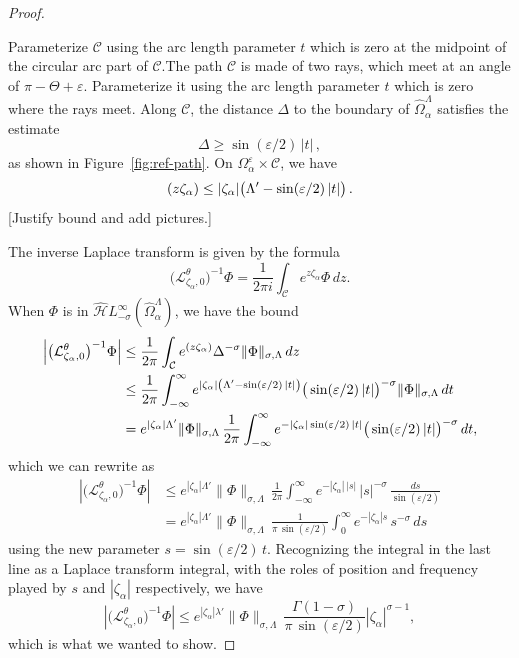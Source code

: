 \documentclass{article}
\let\Re\relax
\DeclareMathOperator{\Re}{Re}
\newcommand{\dualsingexp}[1]{\widehat{\mathcal{H}}L^\infty_{#1}}
\newcommand{\laplace}{\mathcal{L}}
\theoremstyle{definition}
\theoremstyle{plain}
\newenvironment{todo}{\color{Coral}}{\color{black}}
\begin{document}
\begin{proof}
\begin{center}
\label{fig:ref-path}
\end{center}
Parameterize $\mathcal{C}$ using the arc length parameter $t$ which is zero at the midpoint of the circular arc part of $\mathcal{C}$.The path $\mathcal{C}$ is made of two rays, which meet at an angle of $\pi - \Theta + \varepsilon$. Parameterize it using the arc length parameter $t$ which is zero where the rays meet. Along $\mathcal{C}$, the distance $\Delta$ to the boundary of $\widehat{\Omega}_\alpha^\Lambda$ satisfies the estimate
\[ \Delta \ge \sin(\varepsilon/2)\,|t|\,, \]
as shown in Figure~\ref{fig:ref-path}. On $\Omega_\alpha^\varepsilon \times \mathcal{C}$, we have
\[ \Re(z\zeta_\alpha) \le |\zeta_\alpha| \big(\Lambda' - \sin(\varepsilon/2)\,|t|\big)\,. \]
\begin{todo}[Justify bound and add pictures.]\end{todo}

The inverse Laplace transform is given by the formula
\[ \big(\laplace_{\zeta_\alpha, 0}^\theta\big)^{-1} \Phi = \frac{1}{2 \pi i} \int_{\mathcal{C}} e^{z\zeta_\alpha} \Phi\,dz. \]
When $\Phi$ is in $\dualsingexp{-\sigma}(\widehat{\Omega}_\alpha^\Lambda)$, we have the bound
\begin{align*}
\left|\big(\laplace_{\zeta_\alpha, 0}^\theta\big)^{-1} \Phi\right| & \le \frac{1}{2 \pi} \int_{\mathcal{C}} e^{\Re(z\zeta_\alpha)} \Delta^{-\sigma} \|\Phi\|_{\sigma, \Lambda}\,dz \\
& \le \frac{1}{2 \pi} \int_{-\infty}^\infty e^{|\zeta_\alpha| \left(\Lambda' - \sin(\varepsilon/2)\,|t|\right)} \big(\sin(\varepsilon/2)\,|t|\big)^{-\sigma} \|\Phi\|_{\sigma, \Lambda}\,dt \\
& = e^{|\zeta_\alpha| \Lambda'} \|\Phi\|_{\sigma, \Lambda}\,\frac{1}{2 \pi} \int_{-\infty}^\infty e^{-|\zeta_\alpha| \sin(\varepsilon/2)\,|t|} \big(\sin(\varepsilon/2)\,|t|\big)^{-\sigma}\,dt,
\end{align*}
which we can rewrite as
\begin{align*}
\left|\big(\laplace_{\zeta_\alpha, 0}^\theta\big)^{-1} \Phi\right| & \le e^{|\zeta_\alpha| \Lambda'} \|\Phi\|_{\sigma, \Lambda}\,\frac{1}{2 \pi} \int_{-\infty}^\infty e^{-|\zeta_\alpha| \,|s|}\,|s|^{-\sigma}\,\frac{ds}{\sin(\varepsilon/2)} \\
& = e^{|\zeta_\alpha| \Lambda'} \|\Phi\|_{\sigma, \Lambda}\,\frac{1}{\pi\,\sin(\varepsilon/2)} \int_0^\infty e^{-|\zeta_\alpha|s}\,s^{-\sigma}\,ds
\end{align*}
using the new parameter $s = \sin(\varepsilon/2)\,t$. Recognizing the integral in the last line as a Laplace transform integral, with the roles of position and frequency played by $s$ and $|\zeta_\alpha|$ respectively, we have
\[ \left|\big(\laplace_{\zeta_\alpha, 0}^\theta\big)^{-1} \Phi\right| \le e^{|\zeta_\alpha| \lambda'} \|\Phi\|_{\sigma, \Lambda}\,\frac{\Gamma(1-\sigma)}{\pi\,\sin(\varepsilon/2)} |\zeta_\alpha|^{\sigma-1}, \]
which is what we wanted to show.
\end{proof}
%
\end{document}
